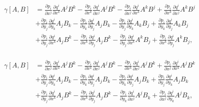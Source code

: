 \documentclass[a4paper,10pt]{article}
\numberwithin{equation}{section}
\begin{document}
\begin{align}
\begin{split}
 \gamma[A,B] &= \frac{\partial p_i}{\partial x^j}\frac{\partial q^i}{\partial x^k}A^jB^k 
 - \frac{\partial p_i}{\partial x^k}\frac{\partial q^i}{\partial x^j}A^jB^k
 - \frac{\partial p_i}{\partial x^j}\frac{\partial q^i}{\partial x^k}A^kB^j 
 + \frac{\partial p_i}{\partial x^k}\frac{\partial q^i}{\partial x^j}A^kB^j\\
 &+ \frac{\partial p_i}{\partial y_j}\frac{\partial q^i}{\partial y_k}A_jB_k 
 - \frac{\partial p_i}{\partial y_k}\frac{\partial q^i}{\partial y_j}A_jB_k
 - \frac{\partial p_i}{\partial y_j}\frac{\partial q^i}{\partial y_k}A_kB_j 
 + \frac{\partial p_i}{\partial y_k}\frac{\partial q^i}{\partial y_j}A_kB_j\\
 &+  \frac{\partial p_i}{\partial y_j}\frac{\partial q^i}{\partial x^k}A_jB^k
 - \frac{\partial p_i}{\partial x^k}\frac{\partial q^i}{\partial y_j}A_jB^k
 -\frac{\partial p_i}{\partial y_j}\frac{\partial q^i}{\partial x^k}A^kB_j 
 + \frac{\partial p_i}{\partial x^k}\frac{\partial q^i}{\partial y_j}A^kB_j,
\end{split}
\end{align}

\begin{align}
\begin{split}
 \gamma[A,B] &= \frac{\partial p_i}{\partial x^j}\frac{\partial q^i}{\partial x^k}A^jB^k 
 - \frac{\partial p_i}{\partial x^k}\frac{\partial q^i}{\partial x^j}A^jB^k
 - \frac{\partial p_i}{\partial x^k}\frac{\partial q^i}{\partial x^j}A^jB^k 
 + \frac{\partial p_i}{\partial x^j}\frac{\partial q^i}{\partial x^k}A^jB^k\\
 &+ \frac{\partial p_i}{\partial y_j}\frac{\partial q^i}{\partial y_k}A_jB_k 
 - \frac{\partial p_i}{\partial y_k}\frac{\partial q^i}{\partial y_j}A_jB_k
 - \frac{\partial p_i}{\partial y_k}\frac{\partial q^i}{\partial y_j}A_jB_k 
 + \frac{\partial p_i}{\partial y_j}\frac{\partial q^i}{\partial y_k}A_jB_k\\
 &+  \frac{\partial p_i}{\partial y_j}\frac{\partial q^i}{\partial x^k}A_jB^k
 - \frac{\partial p_i}{\partial x^k}\frac{\partial q^i}{\partial y_j}A_jB^k
 -\frac{\partial p_i}{\partial y_k}\frac{\partial q^i}{\partial x^j}A^jB_k 
 + \frac{\partial p_i}{\partial x^j}\frac{\partial q^i}{\partial y_k}A^jB_k,
\end{split}
\end{align}
\end{document}
